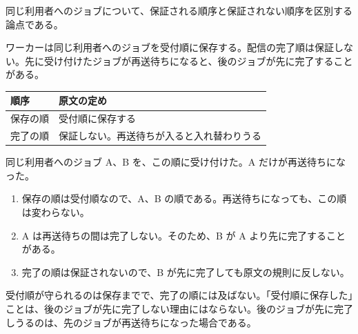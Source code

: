 \documentclass[10pt]{article}
\begin{document}
同じ利用者へのジョブについて、保証される順序と保証されない順序を区別する論点である。

\begin{youten}
ワーカーは同じ利用者へのジョブを受付順に保存する。配信の完了順は保証しない。先に受け付けたジョブが再送待ちになると、後のジョブが先に完了することがある。
\end{youten}

\begin{tabular}{lL{0.6}}
\toprule
順序 & 原文の定め \\
\midrule
保存の順 & 受付順に保存する \\
完了の順 & 保証しない。再送待ちが入ると入れ替わりうる \\
\bottomrule
\end{tabular}

\begin{center}
\end{center}

\begin{reidai}
同じ利用者へのジョブ A、B を、この順に受け付けた。A だけが再送待ちになった。
\begin{enumerate}
  \item 保存の順は受付順なので、A、B の順である。再送待ちになっても、この順は変わらない。
  \item A は再送待ちの間は完了しない。そのため、B が A より先に完了することがある。
  \item 完了の順は保証されないので、B が先に完了しても原文の規則に反しない。
\end{enumerate}
\end{reidai}

\begin{mayoi}
受付順が守られるのは保存までで、完了の順には及ばない。「受付順に保存した」ことは、後のジョブが先に完了しない理由にはならない。後のジョブが先に完了しうるのは、先のジョブが再送待ちになった場合である。
\end{mayoi}
\end{document}
